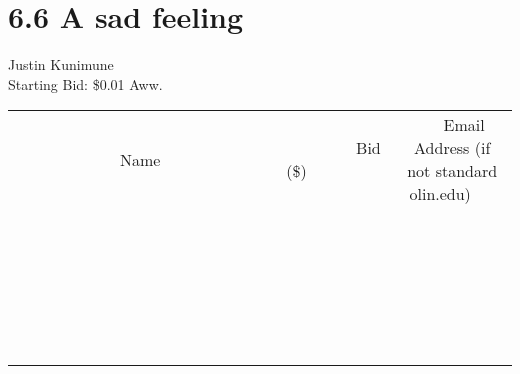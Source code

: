 \documentclass[11pt]{article}
\begin{document}
\section*{6.6 A sad feeling}
Justin Kunimune
\\
Starting Bid: \$0.01
\newline
Aww.
\\[6ex]
\begin{tabular}{c c c}
~~~~~~~~~~~~~Name~~~~~~~~~~~~~ & ~~~~~~~~~Bid (\$)~~~~~~~~~  & ~~~Email Address (if not standard olin.edu)~~~\\
 & & \\
\hline
 & & \\
\hline
 & & \\
\hline
 & & \\
\hline
 & & \\
\hline
 & & \\
\hline
 & & \\
\hline
 & & \\
\hline
 & & \\
\hline
 & & \\
\hline
 & & \\
\hline
 & & \\
\hline
 & & \\
\hline
 & & \\
\hline
 & & \\
\hline
 & & \\
\hline
 & & \\
\hline
 & & \\
\hline
 & & \\
\hline
 & & \\
\hline
 & & \\
\hline
 & & \\
\hline
 & & \\
\hline
 & & \\
\hline
 & & \\
\hline
 & & \\
\hline
\end{tabular}
\newpage
\end{document}
